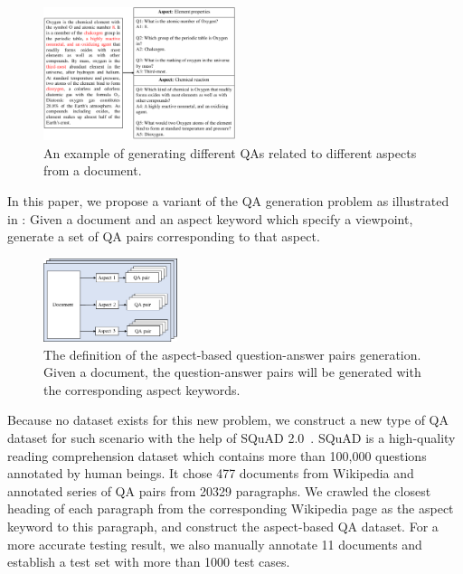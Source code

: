 \begin{figure}[th]
	\centering
	\includegraphics[width=0.5\textwidth]{pic/example.pdf}
	\caption{\label{fig:example} An example of generating different QAs related to different aspects from a document. }
\end{figure}


In this paper, we propose a variant of the QA generation problem as
illustrated in :
Given a document and an aspect keyword which specify a viewpoint, 
generate a set of QA pairs corresponding to that aspect.

\begin{figure}[th]
	\centering
	\includegraphics[width=0.35\textwidth]{pic/process.pdf}
	\caption{\label{fig:process} The definition of the aspect-based 
question-answer pairs generation. 
Given a document, the question-answer pairs will be generated 
with the corresponding aspect keywords. 
} 
\end{figure}

Because no dataset exists for this new problem, we construct 
a new type of QA dataset for such scenario with the help of 
SQuAD 2.0~\cite{rajpurkar2018know}. 
SQuAD is a high-quality reading comprehension dataset which contains more than 100,000 questions annotated by human beings. 
It chose 477 documents from Wikipedia and annotated series of QA pairs from 20329 paragraphs.
We crawled the closest heading of each paragraph from the corresponding Wikipedia page as the aspect keyword to this paragraph, and construct the aspect-based QA dataset. For a more accurate testing result, we also manually annotate 11 documents and establish a test set with more than 1000 test cases.

